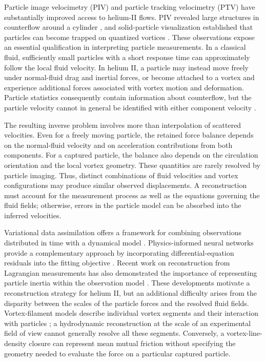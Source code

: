 \documentclass[11pt]{article}
\numberwithin{equation}{section}
\begin{document}
Particle image velocimetry (PIV) and particle tracking velocimetry (PTV) have substantially improved access to helium-II flows. PIV revealed large structures in counterflow around a cylinder \citep{ZhangVanSciver2005}, and solid-particle visualization established that particles can become trapped on quantized vortices \citep{Bewley2006}. These observations expose an essential qualification in interpreting particle measurements. In a classical fluid, sufficiently small particles with a short response time can approximately follow the local fluid velocity. In helium II, a particle may instead move freely under normal-fluid drag and inertial forces, or become attached to a vortex and experience additional forces associated with vortex motion and deformation. Particle statistics consequently contain information about counterflow, but the particle velocity cannot in general be identified with either component velocity \citep{Mineda2013,Mastracci2019}.

The resulting inverse problem involves more than interpolation of scattered velocities. Even for a freely moving particle, the retained force balance depends on the normal-fluid velocity and on acceleration contributions from both components. For a captured particle, the balance also depends on the circulation orientation and the local vortex geometry. These quantities are rarely resolved by particle imaging. Thus, distinct combinations of fluid velocities and vortex configurations may produce similar observed displacements. A reconstruction must account for the measurement process as well as the equations governing the fluid fields; otherwise, errors in the particle model can be absorbed into the inferred velocities.

Variational data assimilation offers a framework for combining observations distributed in time with a dynamical model \citep{LeDimetTalagrand1986}. Physics-informed neural networks provide a complementary approach by incorporating differential-equation residuals into the fitting objective \citep{Raissi2019}. Recent work on reconstruction from Lagrangian measurements has also demonstrated the importance of representing particle inertia within the observation model \citep{ZhouGrauer2026}. These developments motivate a reconstruction strategy for helium II, but an additional difficulty arises from the disparity between the scales of the particle forces and the resolved fluid fields. Vortex-filament models describe individual vortex segments and their interaction with particles \citep{Schwarz1985,Schwarz1988,Mineda2013}; a hydrodynamic reconstruction at the scale of an experimental field of view cannot generally resolve all these segments. Conversely, a vortex-line-density closure can represent mean mutual friction without specifying the geometry needed to evaluate the force on a particular captured particle.
\end{document}
